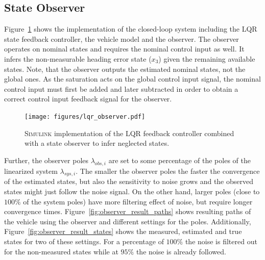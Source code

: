 \subsection{State Observer}
Figure~\ref{fig:lqr_and_observer} shows the implementation of the closed-loop system including the LQR state feedback controller, the vehicle model and the observer.
The observer operates on nominal states and requires the nominal control input as well.
It infers the non-measurable heading error state ($x_3$) given the remaining available states.
Note, that the observer outputs the estimated nominal states, not the global ones.
As the saturation acts on the global control input signal, the nominal control input must first be added and later subtracted in order to obtain a correct control input feedback signal for the observer.

\begin{figure}[h]
	\centering
	\texttt{[image: figures/lqr\_observer.pdf]}
	\caption{\textsc{Simulink} implementation of the LQR feedback controller combined with a state observer to infer neglected states.}
	\label{fig:lqr_and_observer}
\end{figure}

Further, the observer poles $\lambda_{obs,i}$ are set to some percentage of the poles of the linearized system $\lambda_{sys,i}$.
The smaller the observer poles the faster the convergence of the estimated states, but also the sensitivity to noise grows and the observed states might just follow the noise signal.
On the other hand, larger poles (close to $100\%$ of the system poles) have more filtering effect of noise, but require longer convergence times.
Figure~\ref{fig:observer_result_paths} shows resulting paths of the vehicle using the observer and different settings for the poles.
Additionally, Figure~\ref{fig:observer_result_states} shows the measured, estimated and true states for two of these settings.
For a percentage of $100\%$ the noise is filtered out for the non-measured states while at $95\%$ the noise is already followed.

